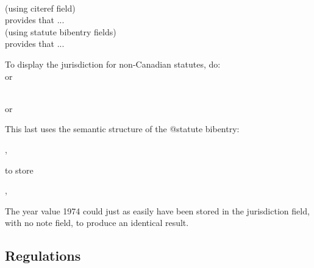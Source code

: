 \ \\
(using citeref field)\\
  provides that ...\\
(using statute bibentry fields) \\
 provides that ...
\par\bigskip

\par\bigskip
{}\par\bigskip
{}\par\bigskip
\noindent To display the jurisdiction for non-Canadian statutes, do:\\
	{\footnotesize\textcolor{blue}{}}
	or
	{\footnotesize\textcolor{blue}{}}
   \toggletrue{statjurisdiction}

   \\
	{\footnotesize\textcolor{blue}{}}
	or
	{\footnotesize\textcolor{blue}{}}
	\togglefalse{statjurisdiction}\par\bigskip
{}\par\bigskip

This last uses the semantic structure of the @statute bibentry:\medskip

,   \medskip

to store\medskip

,  \fbox{\strut \ } \medskip

The year value 1974 could just as easily have been stored in the jurisdiction field, with no note field, to produce an identical result.


\subsection{Regulations}
\par\bigskip
{}\par\bigskip
{}\par\bigskip
{}\par\bigskip


